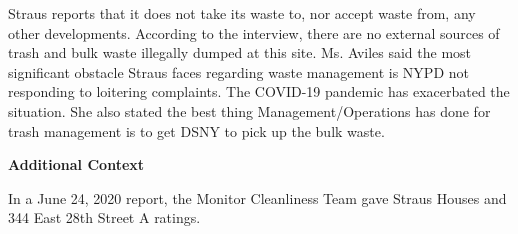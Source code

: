 Straus reports that it does not take its waste to, nor accept waste from, any other developments. According to the interview, there are no external sources of trash and bulk waste illegally dumped at this site. Ms. Aviles said the most significant obstacle Straus faces regarding waste management is NYPD not responding to loitering complaints. The COVID-19 pandemic has exacerbated the situation. She also stated the best thing Management/Operations has done for trash management is to get DSNY to pick up the bulk waste.

\textbf{Additional Context}  

In a June 24, 2020 report, the Monitor Cleanliness Team gave Straus Houses and 344 East 28th Street A ratings. 